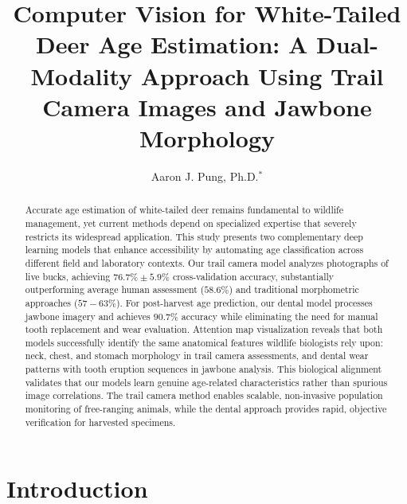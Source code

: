 \documentclass{iopjournal}
\begin{document}

\title{Computer Vision for White-Tailed Deer Age Estimation: A Dual-Modality Approach Using Trail Camera Images and Jawbone Morphology}

\author{Aaron J. Pung, Ph.D.$^{*}$}



\begin{abstract}
Accurate age estimation of white-tailed deer remains fundamental to wildlife management, yet current methods depend on specialized expertise that severely restricts its widespread application. This study presents two complementary deep learning models that enhance accessibility by automating age classification across different field and laboratory contexts. Our trail camera model analyzes photographs of live bucks, achieving $76.7\% \pm 5.9\%$ cross-validation accuracy, substantially outperforming average human assessment ($58.6\%$) and traditional morphometric approaches ($57-63\%$). For post-harvest age prediction, our dental model processes jawbone imagery and achieves $90.7\%$ accuracy while eliminating the need for manual tooth replacement and wear evaluation. Attention map visualization reveals that both models successfully identify the same anatomical features wildlife biologists rely upon: neck, chest, and stomach morphology in trail camera assessments, and dental wear patterns with tooth eruption sequences in jawbone analysis. This biological alignment validates that our models learn genuine age-related characteristics rather than spurious image correlations. The trail camera method enables scalable, non-invasive population monitoring of free-ranging animals, while the dental approach provides rapid, objective verification for harvested specimens.
\end{abstract}

\section{Introduction}
\end{document}
